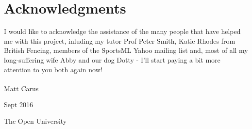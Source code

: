 \cleardoublepage
{}
{}
\section{Acknowledgments}
\vspace{1.0in}
I would like to acknowledge the assistance of the many people that have helped
me with this project, inluding my tutor Prof Peter Smith, Katie Rhodes from
British Fencing, members of the SportsML Yahoo
mailing list and, most of all my long-suffering wife Abby and our dog Dotty -
I'll start paying a bit more attention to you both again now!
\\
\\

Matt Carus

Sept 2016

{The Open University}
\newpage
